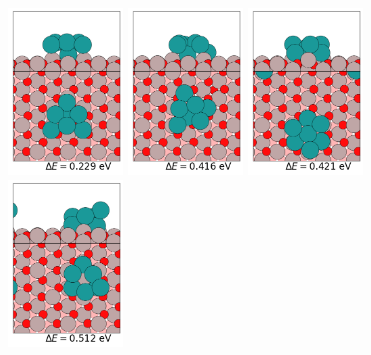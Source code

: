 \documentclass{article}
\begin{document}
\begin{figure}[htp]
\begin{center}
{}
\subfigure
{
  \includegraphics[width=1.2in]{Pt7_Al2O3_Lowlying_DFTrelxed_6.png}
}
\subfigure
{
  \includegraphics[width=1.2in]{Pt7_Al2O3_Lowlying_DFTrelxed_7.png}
}
\subfigure
{
  \includegraphics[width=1.2in]{Pt7_Al2O3_Lowlying_DFTrelxed_8.png}
}
\subfigure
{
  \includegraphics[width=1.2in]{Pt7_Al2O3_Lowlying_DFTrelxed_9.png}
}

\end{center}
\end{figure}
\end{document}
